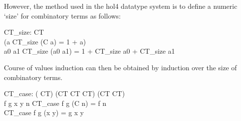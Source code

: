 \begin{GFT}{}
\end{GFT}


However, the method used in the hol4 datatype system is to define a numeric `size' for combinatory terms as follows:

\begin{HOLConst}
\+\PrNM{} \PrNL{}CT\_size\PrNN{}: CT \MMM{\rightarrow} \PrOO{}\\
\PrPH{}\PrPM{}\PrPM{}\PrPM{}\PrPM{}\PrPM{}\PrPM{}\PrPM{}\PrPM{}\PrPM{}\PrPM{}\PrPM{}
\+\PrNM{}	(\MMM{\forall}a\MMM{\bullet}		CT\_size (C a)		= 1 + a)\\
\+\PrNM{} \MMM{\land}	\MMM{\forall}a0 a1\MMM{\bullet}	CT\_size (a0  a1)	= 1 + CT\_size a0 + CT\_size a1\\
\end{HOLConst}

Course of values induction can then be obtained by induction over the size of combinatory terms.

\begin{HOLConst}
\+\PrNM{} \PrNL{}CT\_case\PrNN{}: (\PrOO{} \MMM{\rightarrow} CT) \MMM{\rightarrow} (CT \MMM{\rightarrow} CT \MMM{\rightarrow} CT) \MMM{\rightarrow} (CT \MMM{\rightarrow} CT)\\
\PrPH{}\PrPM{}\PrPM{}\PrPM{}\PrPM{}\PrPM{}\PrPM{}\PrPM{}\PrPM{}\PrPM{}\PrPM{}\PrPM{}
\+\PrNM{} \MMM{\forall}f g x y n\MMM{\bullet}	CT\_case f g (C n) = f n\\
\+\PrNM{}		\MMM{\land}	CT\_case f g (x  y) = g x y\\
\end{HOLConst}


